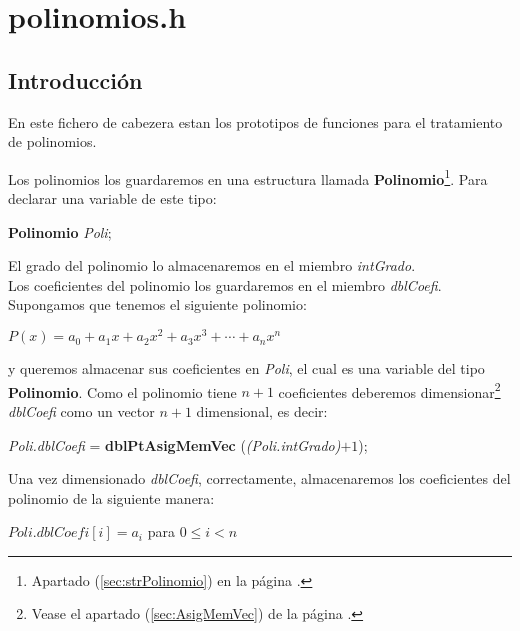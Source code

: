 %
%

\chapter{polinomios.h} \label{sec:polinomios}

\section{Introducci\'on}
En este fichero de cabezera estan los prototipos de funciones para el
tratamiento de polinomios.\newline

\par Los polinomios los guardaremos en una estructura llamada
\textbf{Polinomio}\footnote{Apartado (\ref{sec:strPolinomio}) en la p\'agina
\pageref{sec:strPolinomio}.}. Para declarar una variable de este tipo:

\begin{center}
\textbf{Polinomio} \emph{Poli};
\end{center}

El grado del polinomio lo almacenaremos en el miembro \emph{intGrado}.\\

Los coeficientes del polinomio los guardaremos en el miembro \emph{dblCoefi}.\\

Supongamos que tenemos el siguiente polinomio:

\begin{center}
$
P(x) = a_0 + a_1 x + a_2 x^2 + a_3 x^3 + \cdots + a_n x^n
$
\end{center}

y queremos almacenar sus coeficientes en \emph{Poli}, el cual es una variable
del tipo \textbf{Polinomio}. Como el polinomio tiene $n+1$ coeficientes
deberemos dimensionar\footnote{Vease el apartado (\ref{sec:AsigMemVec}) de la
p\'agina \pageref{sec:AsigMemVec}.} \emph{dblCoefi} como un vector $n+1$
dimensional, es decir:

\begin{center}
\emph{Poli.dblCoefi} = \textbf{dblPtAsigMemVec} (\emph{(Poli.intGrado)$+1$});
\end{center}

Una vez dimensionado \emph{dblCoefi}, correctamente, almacenaremos los
coeficientes del polinomio de la siguiente manera:

\begin{center}
$Poli.dblCoefi[i] = a_i$ para $0 \leq i < n$
\end{center}

